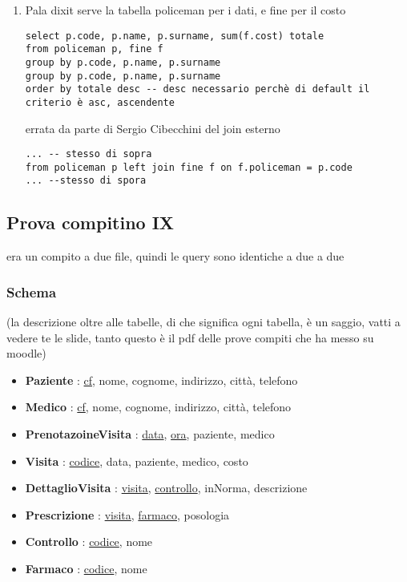 \documentclass[11pt]{article}
\begin{document}
\begin{enumerate}
\item Pala dixit
\label{sec:org0eccd79}
serve la tabella policeman per i dati, e fine per il costo

\begin{verbatim}
select p.code, p.name, p.surname, sum(f.cost) totale
from policeman p, fine f
group by p.code, p.name, p.surname
group by p.code, p.name, p.surname
order by totale desc -- desc necessario perchè di default il criterio è asc, ascendente
\end{verbatim}

errata da parte di Sergio Cibecchini del join esterno
\begin{verbatim}
... -- stesso di sopra
from policeman p left join fine f on f.policeman = p.code
... --stesso di spora

\end{verbatim}
\end{enumerate}

\subsection{Prova compitino IX}
\label{sec:org065b36d}
era un compito a due file, quindi le query sono identiche a due a due
\subsubsection{Schema}
\label{sec:org084f9a2}
(la descrizione oltre alle tabelle, di che significa ogni tabella, è un saggio, vatti a
vedere te le slide, tanto questo è il pdf delle prove compiti che ha messo su moodle)
\begin{itemize}
\item \textbf{Paziente} : \uline{cf}, nome, cognome, indirizzo, città, telefono
\item \textbf{Medico} : \uline{cf}, nome, cognome, indirizzo, città, telefono
\item \textbf{PrenotazoineVisita} : \uline{data}, \uline{ora},  paziente, medico
\item \textbf{Visita} : \uline{codice}, data, paziente, medico, costo
\item \textbf{DettaglioVisita} : \uline{visita}, \uline{controllo},  inNorma, descrizione
\item \textbf{Prescrizione} : \uline{visita}, \uline{farmaco},  posologia
\item \textbf{Controllo} : \uline{codice}, nome
\item \textbf{Farmaco} : \uline{codice}, nome
\end{itemize}
\end{document}
